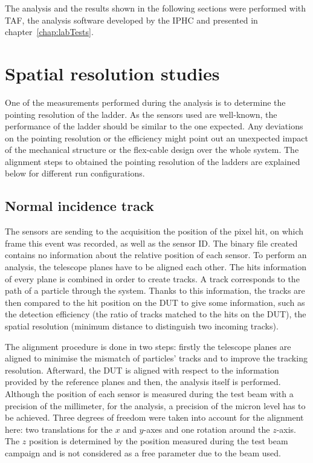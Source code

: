     The analysis and the results shown in the following sections were performed with \gls{TAF}, the analysis software developed by the IPHC and presented in chapter~\ref{chap:labTests}.

  \section{Spatial resolution studies}
   
    One of the measurements performed during the analysis is to determine the pointing resolution of the ladder.
    As the sensors used are well-known, the performance of the ladder should be similar to the one expected.
    Any deviations on the pointing resolution or the efficiency might point out an unexpected impact of the mechanical structure or the flex-cable design over the whole system.
    The alignment steps to obtained the pointing resolution of the ladders are explained below for different run configurations. 

    \subsection{Normal incidence track}

    The sensors are sending to the acquisition the position of the pixel hit, on which frame this event was recorded, as well as the sensor ID.
    The binary file created contains no information about the relative position of each sensor.
    To perform an analysis, the telescope planes have to be aligned each other.
    The hits information of every plane is combined in order to create tracks. 
    A track corresponds to the path of a particle through the system.
    Thanks to this information, the tracks are then compared to the hit position on the \gls{DUT} to give some information, such as the detection efficiency (the ratio of tracks matched to the hits on the \gls{DUT}), the spatial resolution (minimum distance to distinguish two incoming tracks).

    The alignment procedure is done in two steps: firstly the telescope planes are aligned to minimise the mismatch of particles' tracks and to improve the tracking resolution.
    Afterward, the \gls{DUT} is aligned with respect to the information provided by the reference planes and then, the analysis itself is performed.
    Although the position of each sensor is measured during the test beam with a precision of the millimeter, for the analysis, a precision of the micron level has to be achieved.
    Three degrees of freedom were taken into account for the alignment here: two translations for the $x$ and $y$-axes and one rotation around the $z$-axis.
    The $z$ position is determined by the position measured during the test beam campaign and is not considered as a free parameter due to the beam used.

